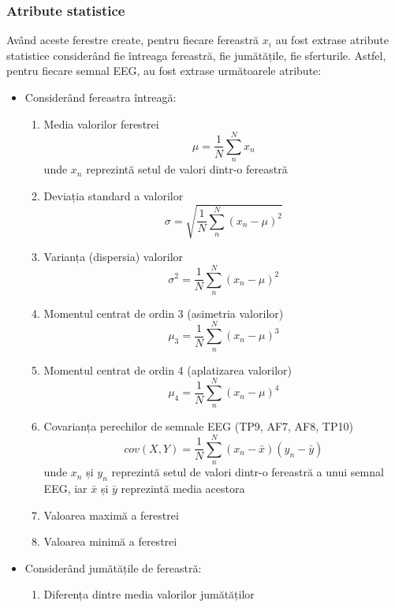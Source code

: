 \subsubsection*{Atribute statistice}
Având aceste ferestre create, pentru fiecare fereastră $x_i$ au fost extrase atribute statistice considerând fie întreaga fereastră, fie jumătățile, fie sferturile. Astfel, pentru fiecare semnal EEG, au fost extrase următoarele atribute:
\begin{itemize}
	\item Considerând fereastra întreagă:
	\begin{enumerate}
	\item Media valorilor ferestrei
	\begin{equation}
	\mu = \frac{1}{N}\sum_n^N x_n
	\end{equation}
	unde $x_n$ reprezintă setul de valori dintr-o fereastră
	\item Deviația standard a valorilor
	\begin{equation}
	\sigma = \sqrt{\frac{1}{N}\sum_n^N(x_n - \mu)^2}
	\end{equation}
	\item Varianța (dispersia) valorilor
	\begin{equation}
	\sigma^2 = \frac{1}{N}\sum_n^N(x_n - \mu)^2
	\end{equation}
	\item Momentul centrat de ordin 3 (asimetria valorilor) 
	\begin{equation}
	\mu_3 = \frac{1}{N}\sum_n^N(x_n - \mu)^3
	\end{equation}
	\item Momentul centrat de ordin 4 (aplatizarea valorilor)
	\begin{equation}
	\mu_4 = \frac{1}{N}\sum_n^N(x_n - \mu)^4
	\end{equation}
	\item Covarianța perechilor de semnale EEG (TP9, AF7, AF8, TP10)
	\begin{equation}
	cov(X,Y) = \frac{1}{N}\sum_n^N(x_n - \bar{x})(y_n - \bar{y})
	\end{equation}
	unde $x_n$ și $y_n$ reprezintă setul de valori dintr-o fereastră a unui semnal EEG, iar $\bar{x}$ și $\bar{y}$ reprezintă media acestora
	\item Valoarea maximă a ferestrei
	\item Valoarea minimă a ferestrei
	\end{enumerate}
	\item Considerând jumătățile de fereastră:
	\begin{enumerate}
		\item Diferența dintre media valorilor jumătăților
	\end{enumerate}
\end{itemize}

